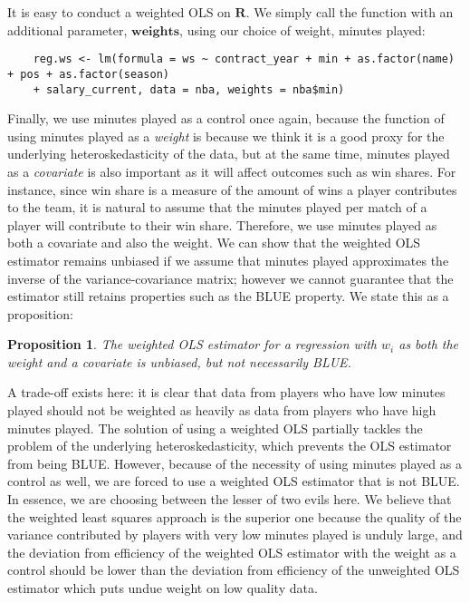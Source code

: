 \documentclass[12pt]{article}
\newtheorem{proposition}{Proposition}
\begin{document}
	It is easy to conduct a weighted OLS on $\textbf{R}$. We simply call the function with an additional parameter, $\textbf{weights}$, using our choice of weight, minutes played:
	
	\begin{lstlisting}
	reg.ws <- lm(formula = ws ~ contract_year + min + as.factor(name) + pos + as.factor(season) 
	+ salary_current, data = nba, weights = nba$min)
	\end{lstlisting}
	
	Finally, we use minutes played as a control once again, because the function of using minutes played as a \emph{weight} is because we think it is a good proxy for the underlying heteroskedasticity of the data, but at the same time, minutes played as a \emph{covariate} is also important as it will affect outcomes such as win shares. For instance, since win share is a measure of the amount of wins a player contributes to the team, it is natural to assume that the minutes played per match of a player will contribute to their win share. Therefore, we use minutes played as both a covariate and also the weight. We can show that the weighted OLS estimator remains unbiased if we assume that minutes played approximates the inverse of the variance-covariance matrix; however we cannot guarantee that the estimator still retains properties such as the BLUE property. We state this as a proposition:
	
	\begin{proposition}
		The weighted OLS estimator for a regression with $w_i$ as both the weight and a covariate is unbiased, but not necessarily BLUE.
	\end{proposition}

	A trade-off exists here: it is clear that data from players who have low minutes played should not be weighted as heavily as data from players who have high minutes played. The solution of using a weighted OLS partially tackles the problem of the underlying heteroskedasticity, which prevents the OLS estimator from being BLUE. However, because of the necessity of using minutes played as a control as well, we are forced to use a weighted OLS estimator that is not BLUE. In essence, we are choosing between the lesser of two evils here. We believe that the weighted least squares approach is the superior one because the quality of the variance contributed by players with very low minutes played is unduly large, and the deviation from efficiency of the weighted OLS estimator with the weight as a control should be lower than the deviation from efficiency of the unweighted OLS estimator which puts undue weight on low quality data.
	
\end{document}
